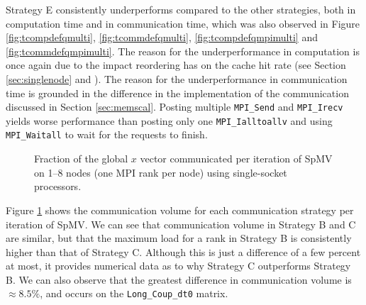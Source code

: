 \medskip

Strategy E consistently underperforms compared to the other strategies, both in computation time and in communication time, which was also observed in Figure \ref{fig:tcompdefqmulti}, \ref{fig:tcommdefqmulti}, \ref{fig:tcompdefqmpimulti} and \ref{fig:tcommdefqmpimulti}. The reason for the underperformance in computation is once again due to the impact reordering has on the cache hit rate (see Section \ref{sec:singlenode} and \cite{ordersparse}). The reason for the underperformance in communication time is grounded in the difference in the implementation of the communication discussed in Section \ref{sec:memscal}. Posting multiple \texttt{MPI\_Send} and \texttt{MPI\_Irecv} yields worse performance than posting only one \texttt{MPI\_Ialltoallv} and using \texttt{MPI\_Waitall} to wait for the requests to finish.

\begin{figure}[H]
    \centering
    \caption{Fraction of the global \(x\) vector communicated per iteration of SpMV on 1–8 nodes (one MPI rank per node) using single-socket \romeq{} processors.}
    \label{fig:commloadromemulti}
\end{figure}

Figure \ref{fig:commloadromemulti} shows the communication volume for each communication strategy per iteration of SpMV. We can see that communication volume in Strategy B and C are similar, but that the maximum load for a rank in Strategy B is consistently higher than that of Strategy C. Although this is just a difference of a few percent at most, it provides numerical data as to why Strategy C outperforms Strategy B. We can also observe that the greatest difference in communication volume is \(\approx 8.5\%\), and occurs on the \texttt{Long\_Coup\_dt0} matrix.
